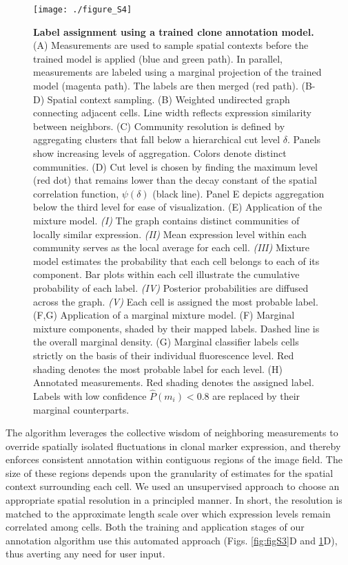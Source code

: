 \begin{figure}[h]
\texttt{[image: ./figure\_S4]}
\caption[Label assignment using a trained clone annotation model.]{\textbf{Label assignment using a trained clone annotation model.} (A) Measurements are used to sample spatial contexts before the trained model is applied (blue and green path). In parallel, measurements are labeled using a marginal projection of the trained model (magenta path). The labels are then merged (red path). (B-D) Spatial context sampling. (B) Weighted undirected graph connecting adjacent cells. Line width reflects expression similarity between neighbors. (C) Community resolution is defined by aggregating clusters that fall below a hierarchical cut level $\delta$. Panels show increasing levels of aggregation. Colors denote distinct communities. (D) Cut level is chosen by finding the maximum level (red dot) that remains lower than the decay constant of the spatial correlation function, $\psi(\delta)$ (black line). Panel E depicts aggregation below the third level for ease of visualization. (E) Application of the mixture model. \emph{(I)} The graph contains distinct communities of locally similar expression. \emph{(II)} Mean expression level within each community serves as the local average for each cell. \emph{(III)} Mixture model estimates the probability that each cell belongs to each of its component. Bar plots within each cell illustrate the cumulative probability of each label. \emph{(IV)} Posterior probabilities are diffused across the graph. \emph{(V)} Each cell is assigned the most probable label. (F,G) Application of a marginal mixture model. (F) Marginal mixture components, shaded by their mapped labels. Dashed line is the overall marginal density. (G) Marginal classifier labels cells strictly on the basis of their individual fluorescence level. Red shading denotes the most probable label for each level. (H) Annotated measurements. Red shading denotes the assigned label. Labels with low confidence $\hat{P}(m_i)<0.8$ are replaced by their marginal counterparts.}
\label{fig:figS4}
\end{figure}

The algorithm leverages the collective wisdom of neighboring measurements to override spatially isolated fluctuations in clonal marker expression, and thereby enforces consistent annotation within contiguous regions of the image field. The size of these regions depends upon the granularity of estimates for the spatial context surrounding each cell. We used an unsupervised approach to choose an appropriate spatial resolution in a principled manner. In short, the resolution is matched to the approximate length scale over which expression levels remain correlated among cells. Both the training and application stages of our annotation algorithm use this automated approach (Figs. \ref{fig:figS3}D and \ref{fig:figS4}D), thus averting any need for user input.



